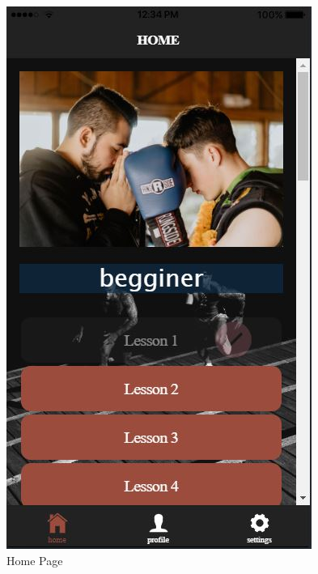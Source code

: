 \documentclass[a4paper,12pt]{article}
\begin{document}
			\begin{figure}[!htb]
				\caption{Home Page}
				\vspace*{0.5cm}

				  \includegraphics[width=\linewidth]{home1}
				  

\end{figure}
\end{document}
